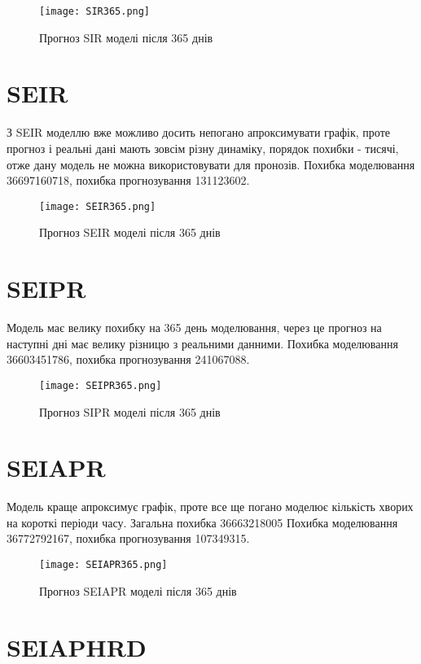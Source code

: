 \begin{figure}[H]
    \centering
    \texttt{[image: SIR365.png]}
    \caption{Прогноз SIR моделі після 365 днів}
    \label{fig:plot1}
\end{figure}


\section{SEIR}


З SEIR моделлю вже можливо досить непогано апроксимувати графік, проте 
прогноз і реальні дані мають зовсім різну динаміку, порядок похибки - 
тисячі, отже дану модель не можна використовувати для пронозів. 
Похибка моделювання 36697160718, похибка прогнозування 131123602.


\begin{figure}[H]
    \centering
    \texttt{[image: SEIR365.png]}
    \caption{Прогноз SEIR моделі після 365 днів}
    \label{fig:plot2}
\end{figure}
\section{SEIPR}

Модель має велику похибку на 365 день моделювання, через це прогноз 
на наступні дні має велику різницю з реальними данними. 
Похибка моделювання 36603451786, похибка прогнозування 241067088.

\begin{figure}[H]
    \centering
    \texttt{[image: SEIPR365.png]}
    \caption{Прогноз SIPR моделі після 365 днів}
    \label{fig:plot3}
\end{figure}
\section{SEIAPR}

Модель краще апроксимує графік, проте все ще погано моделює 
кількість хворих на короткі періоди часу. 
Загальна похибка 36663218005
Похибка моделювання 36772792167, похибка прогнозування 107349315.
\begin{figure}[H]
    \centering
    \texttt{[image: SEIAPR365.png]}
    \caption{Прогноз SEIAPR моделі після 365 днів}
    \label{fig:plot4}
\end{figure}
\section{SEIAPHRD}


